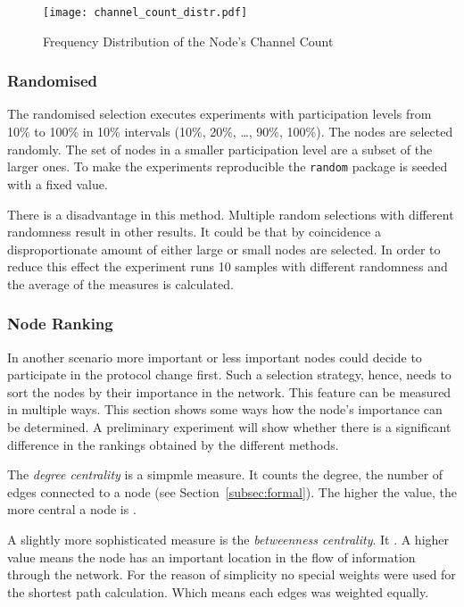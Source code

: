 \documentclass[final]{fhnwreport}       %
\begin{document}
\begin{figure}[H]
\centering
\texttt{[image: channel\_count\_distr.pdf]}
\caption{Frequency Distribution of the Node's Channel Count}
\label{fig:channelcount}
\end{figure}

\subsubsection{Randomised}
The randomised selection executes experiments with participation levels from 10\% to 100\% in 10\% intervals (10\%, 20\%, \ldots, 90\%, 100\%). The nodes are selected randomly. The set of nodes in a smaller participation level are a subset of the larger ones. To make the experiments reproducible the \texttt{random} package is seeded with a fixed value.

There is a disadvantage in this method. Multiple random selections with different randomness result in other results. It could be that by coincidence a disproportionate amount of either large or small nodes are selected. In order to reduce this effect the experiment runs 10 samples with different randomness and the average of the measures is calculated. 

\subsubsection{Node Ranking}
In another scenario more important or less important nodes could decide to participate in the protocol change first. Such a selection strategy, hence, needs to sort the nodes by their importance in the network. This feature can be measured in multiple ways. This section shows some ways how the node's importance can be determined. A preliminary experiment will show whether there is a significant difference in the rankings obtained by the different methods.

The \emph{degree centrality} is a simpmle measure. It counts the degree, the number of edges connected to a node (see Section~\ref{subsec:formal}). The higher the value, the more central a node is \citep{golbeck_analyzing_2013}.

A slightly more sophisticated measure is the \emph{betweenness centrality}. It . A higher value means the node has an important location in the flow of information through the network. For the reason of simplicity no special weights were used for the shortest path calculation. Which means each edges was weighted equally.
\end{document}

